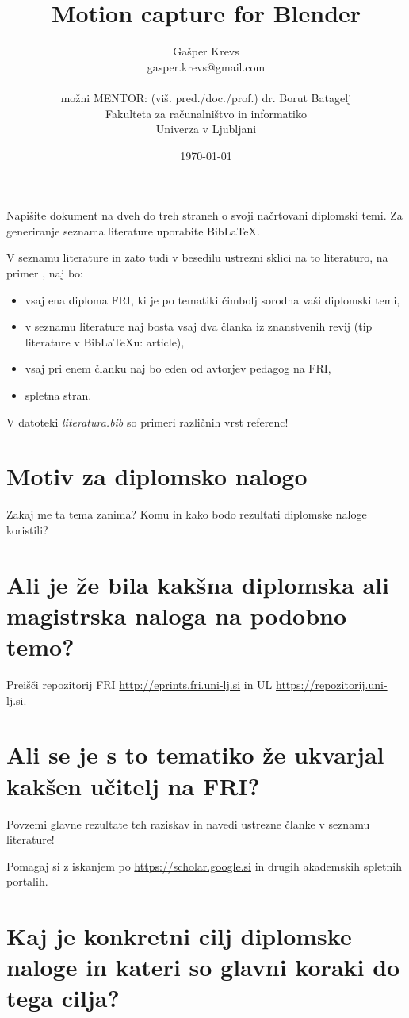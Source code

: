 \documentclass[11pt,a4paper]{article}
\title{Motion capture for Blender}
\author{Gašper Krevs\\
gasper.krevs@gmail.com\\
\ \\
možni MENTOR: (viš. pred./doc./prof.) dr. Borut Batagelj \\
Fakulteta za računalništvo in informatiko\\
Univerza v Ljubljani
\date{\today}         
}
\begin{document}
\maketitle

Napišite dokument na dveh do treh straneh o svoji načrtovani diplomski temi.
Za generiranje seznama literature uporabite BibLaTeX. 

V seznamu literature in zato tudi v besedilu ustrezni sklici na to literaturo, na primer \cite{ravnik2013audience}, naj bo:
\begin{itemize}
\item 
vsaj ena diploma FRI, ki je po tematiki čimbolj sorodna vaši diplomski temi,
\item
v seznamu literature naj bosta vsaj dva članka iz znanstvenih revij (tip literature v BibLaTeXu: article), 
\item
vsaj pri enem članku naj bo eden od avtorjev pedagog na FRI,
\item
spletna stran.
\end{itemize}
V datoteki \textit{literatura.bib} so primeri različnih vrst referenc!



\section{Motiv za diplomsko nalogo}

Zakaj me ta tema zanima? 
Komu in kako bodo rezultati diplomske naloge koristili?

\section{Ali je že bila kakšna diplomska ali magistrska naloga na podobno temo?}

Preišči repozitorij FRI \url{http://eprints.fri.uni-lj.si}
in UL \url{https://repozitorij.uni-lj.si}.


\section{Ali se je s to tematiko že ukvarjal kakšen učitelj na FRI?}

Povzemi glavne rezultate teh raziskav in navedi ustrezne članke v seznamu literature!

Pomagaj si z iskanjem po \url{https://scholar.google.si} in drugih akademskih spletnih portalih.


\section{Kaj je konkretni cilj diplomske naloge in kateri so glavni koraki do tega cilja?}
\end{document}
